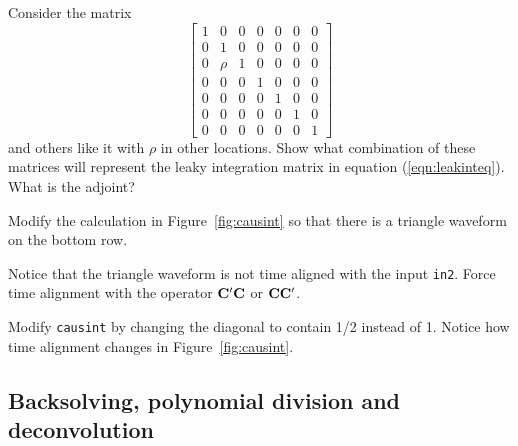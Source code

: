 \begin{exer}

\item
Consider the matrix
\begin{equation}
  \left[
        \begin{array}{cccccccc}
             1 &     0 &     0 &     0 &     0 &     0 &     0 \\
             0 &     1 &     0 &     0 &     0 &     0 &     0 \\
             0 &  \rho &     1 &     0 &     0 &     0 &     0 \\
             0 &     0 &     0 &     1 &     0 &     0 &     0 \\
             0 &     0 &     0 &     0 &     1 &     0 &     0 \\
             0 &     0 &     0 &     0 &     0 &     1 &     0 \\
             0 &     0 &     0 &     0 &     0 &     0 &     1 
        \end{array}
  \right]
\end{equation}
and others like it with $\rho$ in other locations.
Show what combination of these matrices will represent
the leaky integration matrix
in equation (\ref{eqn:leakinteq}).  What is the adjoint?

\item
Modify the calculation in Figure~\ref{fig:causint} so that there is
a triangle waveform on the bottom row.
\item
Notice that the triangle waveform is not time aligned
with the input {\tt in2}.
Force time alignment with the operator 
${\bold C' \bold C}$ or
${\bold C  \bold C'}$.
\item
Modify \texttt{causint}  by changing the diagonal to contain
1/2 instead of 1.
Notice how time alignment changes in Figure~\ref{fig:causint}.
\end{exer}




\subsection{Backsolving, polynomial division and deconvolution}

